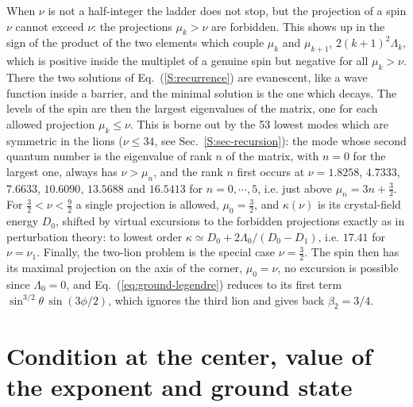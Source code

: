 When $\nu$ is not a half-integer the ladder does not stop, but the projection of a spin $\nu$ cannot exceed $\nu$: the projections $\mu_k > \nu$ are forbidden. This shows up in the sign of the product of the two elements which couple $\mu_k$ and $\mu_{k+1}$, $2 (k+1)^2 \Lambda_k$, which is positive inside the multiplet of a genuine spin but negative for all $\mu_k > \nu$. There the two solutions of Eq.~(\ref{S:recurrence}) are evanescent, like a wave function inside a barrier, and the minimal solution is the one which decays. The levels of the spin are then the largest eigenvalues of the matrix, one for each allowed projection $\mu_k \leq \nu$. This is borne out by the 53 lowest modes which are symmetric in the lions ($\nu \leq 34$, see Sec.~\ref{S:sec-recursion}): the mode whose second quantum number is the eigenvalue of rank $n$ of the matrix, with $n = 0$ for the largest one, always has $\nu > \mu_n$, and the rank $n$ first occurs at $\nu = 1.8258$, $4.7333$, $7.6633$, $10.6090$, $13.5688$ and $16.5413$ for $n = 0, \cdots, 5$, i.e. just above $\mu_n = 3n + \frac{3}{2}$. For $\frac{3}{2} < \nu < \frac{9}{2}$ a single projection is allowed, $\mu_0 = \frac{3}{2}$, and $\kappa(\nu)$ is its crystal-field energy $D_0$, shifted by virtual excursions to the forbidden projections exactly as in perturbation theory: to lowest order $\kappa \simeq D_0 + 2 \Lambda_0/(D_0 - D_1)$, i.e. $17.41$ for $\nu = \nu_1$. Finally, the two-lion problem is the special case $\nu = \frac{3}{2}$. The spin then has its maximal projection on the axis of the corner, $\mu_0 = \nu$, no excursion is possible since $\Lambda_0 = 0$, and Eq.~(\ref{eq:ground-legendre}) reduces to its first term $\sin^{3/2} \theta \, \sin(3\phi/2)$, which ignores the third lion and gives back $\beta_2 = 3/4$.


\section{Condition at the center, value of the exponent and ground state} \label{S:sec-center}

